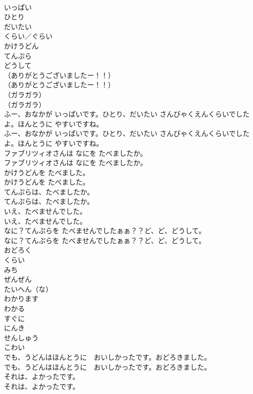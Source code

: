 \documentclass[8pt]{extreport}
\begin{document}
\begin{CJK}{UTF8}{min}
\\	いっぱい
\\	ひとり
\\	だいたい
\\	くらい／ぐらい
\\	かけうどん
\\	てんぷら
\\	どうして
\\	（ありがとうございましたー！！）	
\\	（ありがとうございましたー！！） 
\\	（ガラガラ）	
\\	（ガラガラ） 
\\	ふー、おなかが いっぱいです。ひとり、だいたい さんびゃくえんくらいでしたよ。ほんとうに やすいですね。	
\\	ふー、おなかが いっぱいです。ひとり、だいたい さんびゃくえんくらいでしたよ。ほんとうに やすいですね。 
\\	ファブリツィオさんは なにを たべましたか。	
\\	ファブリツィオさんは なにを たべましたか。 
\\	かけうどんを たべました。	
\\	かけうどんを たべました。 
\\	てんぷらは、たべましたか。	
\\	てんぷらは、たべましたか。 
\\	いえ、たべませんでした。	
\\	いえ、たべませんでした。 
\\	なに？てんぷらを たべませんでしたぁぁ？？ど、ど、どうして。	
\\	なに？てんぷらを たべませんでしたぁぁ？？ど、ど、どうして。 
\\	おどろく
\\	くらい
\\	みち
\\	ぜんぜん
\\	たいへん（な）
\\	わかります
\\	わかる
\\	すぐに
\\	にんき
\\	せんしゅう
\\	こわい
\\	でも、うどんはほんとうに　おいしかったです。おどろきました。	
\\	でも、うどんはほんとうに　おいしかったです。おどろきました。 
\\	それは、よかったです。	
\\	それは、よかったです。 

\end{CJK}
\end{document}
